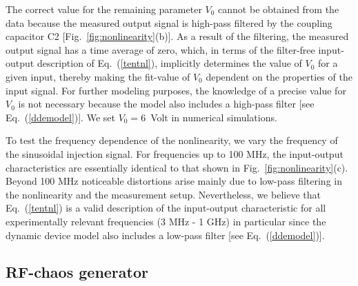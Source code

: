 \documentclass[aps,twocolumn,pre,nofootinbib]{revtex4}
\begin{document}
The correct value for the remaining parameter $V_0$ cannot be obtained from the data because the measured output signal is high-pass filtered by the coupling capacitor C2 [Fig.~\ref{fig:nonlinearity}(b)]. As a result of the filtering, the measured output signal has a time average of zero, which, in terms of the filter-free input-output description of Eq.~(\ref{tentnl}), implicitly determines the value of $V_0$ for a given input, thereby making the fit-value of $V_0$ dependent on the properties of the input signal.
For further modeling purposes, the knowledge of a precise value for $V_0$ is not necessary because the model also includes a high-pass filter [see Eq.~(\ref{ddemodel})].
 We set $V_0=6$~Volt in numerical simulations.

To test the frequency dependence of the nonlinearity, we vary the frequency of the sinusoidal injection signal. For frequencies up to 100 MHz, the input-output characteristics are essentially identical to that shown in  Fig.~\ref{fig:nonlinearity}(c). Beyond 100 MHz noticeable distortions arise mainly due to low-pass filtering in the nonlinearity and the measurement setup.
Nevertheless, we believe that Eq.~(\ref{tentnl}) is a valid description of the  input-output characteristic for all experimentally relevant frequencies (3 MHz - 1 GHz) in particular since the dynamic device model also includes a low-pass filter [see Eq.~(\ref{ddemodel})]. 



\subsection{RF-chaos generator}
\end{document}
